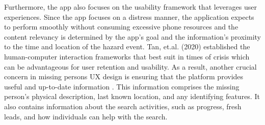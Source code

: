 Furthermore, the app also focuses on the usability framework that leverages user experiences. Since the app focuses on a distress manner, the application expects to perform smoothly without consuming excessive phone resources and the content relevancy is determined by the app's goal and the information's proximity to the time and location of the hazard event. Tan, et.al. (2020) established the human-computer interaction frameworks that best suit in times of crisis which can be advantageous for user retention and usability. As a result, another crucial concern in missing persons UX design is ensuring that the platform provides useful and up-to-date information \cite{tan_etal_2020}. This information comprises the missing person's physical description, last known location, and any identifying features. It also contains information about the search activities, such as progress, fresh leads, and how individuals can help with the search.
